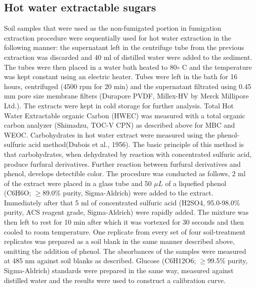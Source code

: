     \subsection{Hot water extractable sugars}

    	Soil samples that were used as the non-fumigated portion in fumigation extraction procedure were sequentially used for hot water extraction in the following manner: the supernatant left in the centrifuge tube from the previous extraction was discarded and 40 ml of distilled water were added to the sediment. The tubes were then placed in a water bath heated to 80$\circ$ C and the temperature was kept constant using an electric heater. Tubes were left in the bath for 16 hours, centrifuged (4500 rpm for 20 min) and the supernatant filtrated using 0.45 mm pore size membrane filters (Durapore PVDF, Millex-HV by Merck Millipore Ltd.). The extracts were kept in cold storage for further analysis.
    	Total Hot Water Extractable organic Carbon (HWEC) was measured with a  total organic carbon analyzer (Shimadzu, TOC-V CPN) as described above for MBC and WEOC.
    	Carbohydrates in hot water extract were measured using the phenol-sulfuric acid method(Dubois et al., 1956). The basic principle of this method is that carbohydrates, when dehydrated by reaction with concentrated sulfuric acid, produce furfural derivatives. Further reaction between furfural derivatives and phenol, develops detectible color. The procedure was conducted as follows, 2 ml of the extract were placed in a glass tube and 50 $ \mu L $ of a liquefied phenol (C6H6O; $ \geq $89.0\% purity, Sigma-Aldrich) were added to the extract. Immediately after that 5 ml of concentrated sulfuric acid (H2SO4, 95.0-98.0\% purity, ACS reagent grade, Sigma-Aldrich) were rapidly added. The mixture was then left to rest for 10 min after which it was vortexed for 30 seconds and then cooled to room temperature. One replicate from every set of four soil-treatment replicates was prepared as a soil blank in the same manner described above, omitting the addition of phenol. The absorbances of the samples were measured at 485 nm against soil blanks as described. Glucose (C6H12O6; $ \geq $99.5\% purity, Sigma-Aldrich) standards were prepared in the same way, measured against distilled water and the results were used to construct a calibration curve.


